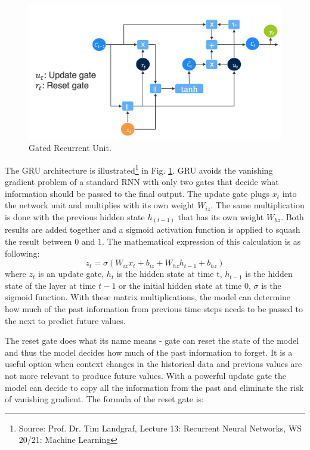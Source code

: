 \begin{figure}[htb]
	\begin{center}
		\includegraphics[width=1\textwidth, keepaspectratio]{gfx/gru.png}
		\caption{\label{fig:gru}Gated Recurrent Unit.}
	\end{center}
\end{figure}

The GRU architecture is illustrated\footnote{Source: Prof. Dr. Tim Landgraf, Lecture 13: Recurrent Neural Networks, WS 20/21: Machine Learning} in Fig. \ref{fig:gru}. GRU avoids the vanishing gradient problem of a standard RNN with only two gates that decide what information should be passed to the final output. The update gate plugs $x_t$ into the network unit and multiplies with its own weight $W_{iz}$. The same multiplication is done with the previous hidden state $h_(t-1)$ that has its own weight $W_{hz}$. Both results are added together and a sigmoid activation function is applied to squash the result between 0 and 1. The mathematical expression of this calculation is as following:
\begin{equation}
z_t = \sigma (W_{iz}x_t + b_{iz} + W_{hz}h_{t-1} + b_{hz})
\end{equation}
where  $z_t$ is an update gate, $h_{t}$  is the hidden state at time t, $h_{t-1}$ is the hidden state of the layer at time $t-1$ or the initial hidden state at time $0$, $\sigma$ is the sigmoid function. With these matrix multiplications, the model can determine how much of the past information from previous time steps needs to be passed to the next to predict future values. 

The reset gate does what its name means - gate can reset the state of the model and thus the model decides how much of the past information to forget. It is a useful option when context changes in the historical data and previous values are not more relevant to produce future values. With a powerful update gate the model can decide to copy all the information from the past and eliminate the risk of vanishing gradient. The formula of the reset gate is:

